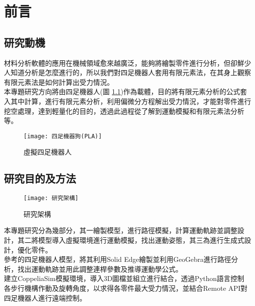 \chapter{前言}
\renewcommand{\baselinestretch}{10.0} %
\setcounter{page}{1}  %
\fontsize{14pt}{2.5pt}\sectionef

\section{研究動機}
材料分析軟體的應用在機械領域愈來越廣泛，能夠將繪製零件進行分析，但卻鮮少人知道分析是怎麼進行的，所以我們對四足機器人套用有限元素法，在其身上觀察有限元素法是如何計算出受力情況。\\

本專題研究方向將由四足機器人(圖 \ref{四足機器狗(PLA)})作為載體，目的將有限元素分析的公式套入其中計算，進行有限元素分析，利用偏微分方程解出受力情況，才能對零件進行挖空處理，達到輕量化的目的，透過此過程從了解到運動模擬和有限元素法分析等。\\

\begin{figure}[hbt!]
\center
\texttt{[image: 四足機器狗(PLA)]}
\caption{\Large 虛擬四足機器人}\label{四足機器狗(PLA)}
\end{figure}
\newpage
\section{研究目的及方法}
\begin{figure}[hbt!]
\begin{center}
\texttt{[image: 研究架構]}
\caption{\Large 研究架構}\label{研究架構}
\end{center}
\end{figure}
本專題研究分為幾部分，其一繪製模型，進行路徑模擬，計算運動軌跡並調整設計，其二將模型導入虛擬環境進行運動模擬，找出運動姿態，其三為進行生成式設計，優化零件。\\

參考的四足機器人模型，將其利用Solid Edge繪製並利用GeoGebra進行路徑分析，找出運動軌跡並用此調整連桿參數及推導運動學公式。\\

建立CoppeliaSim模擬環境，導入3D圖檔並組立進行結合，透過Python語言控制各步行機構作動及旋轉角度，以求得各零件最大受力情況，並結合Remote API對四足機器人進行遠端控制。\\

